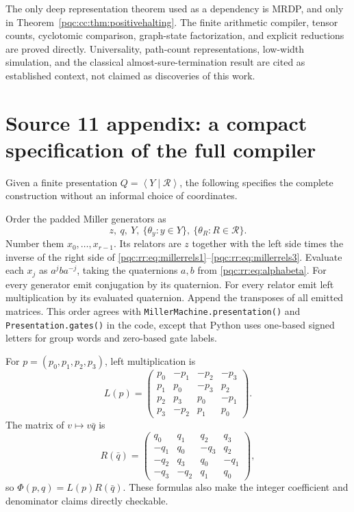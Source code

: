 \documentclass[11pt,letterpaper]{article}
\numberwithin{equation}{section}
\theoremstyle{definition}
\theoremstyle{remark}
\newcommand{\code}[1]{\nolinkurl{#1}}
\newcommand{\pair}[1]{\left\langle #1\right\rangle}
\begin{document}
The only deep representation theorem used as a dependency is MRDP, and only
in Theorem~\ref{pqc:cc:thm:positivehalting}. The finite arithmetic compiler, tensor
counts, cyclotomic comparison, graph-state factorization, and explicit
reductions are proved directly. Universality, path-count representations,
low-width simulation, and the classical almost-sure-termination result are
cited as established context, not claimed as discoveries of this work.
\section{Source 11 appendix: a compact specification of the full compiler}
\label{pqc:rr:app:compiler}

Given a finite presentation $Q=\pair{Y\mid\mathcal R}$, the following
specifies the complete construction without an informal choice of
coordinates.

Order the padded Miller generators as
\[
 z,\ q,\ Y,\ \{\theta_y:y\in Y\},\
 \{\theta_R:R\in\mathcal R\}.
\]
Number them $x_0,\ldots,x_{r-1}$. Its relators are $z$ together with the
left side times the inverse of the right side of
\eqref{pqc:rr:eq:millerrels1}--\eqref{pqc:rr:eq:millerrels3}. Evaluate each $x_j$ as
$a^jba^{-j}$, taking the quaternions $a,b$ from
\eqref{pqc:rr:eq:alphabeta}. For every generator emit conjugation by its
quaternion. For every relator emit left multiplication by its evaluated
quaternion. Append the transposes of all emitted matrices. This order
agrees with \code{MillerMachine.presentation()} and
\code{Presentation.gates()} in the code, except that Python uses
one-based signed letters for group words and zero-based gate labels.

For $p=(p_0,p_1,p_2,p_3)$, left multiplication is
\[
 L(p)=\begin{pmatrix}
 p_0&-p_1&-p_2&-p_3\\
 p_1&p_0&-p_3&p_2\\
 p_2&p_3&p_0&-p_1\\
 p_3&-p_2&p_1&p_0
 \end{pmatrix}.
\]
The matrix of $v\mapsto v\bar q$ is
\[
 R(\bar q)=\begin{pmatrix}
 q_0&q_1&q_2&q_3\\
 -q_1&q_0&-q_3&q_2\\
 -q_2&q_3&q_0&-q_1\\
 -q_3&-q_2&q_1&q_0
 \end{pmatrix},
\]
so $\Phi(p,q)=L(p)R(\bar q)$. These formulas also make the integer
coefficient and denominator claims directly checkable.
\end{document}
